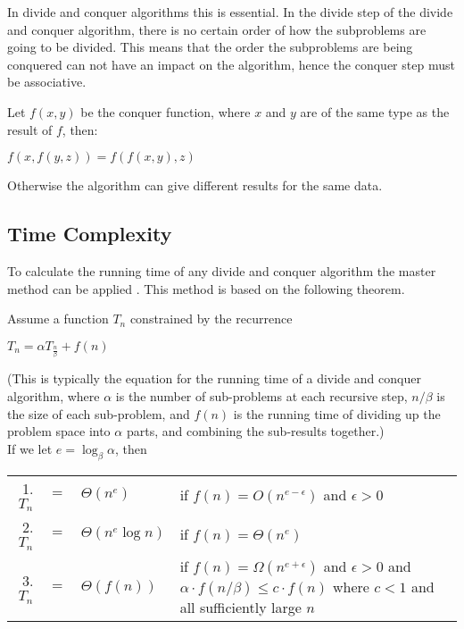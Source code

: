 In divide and conquer algorithms this is essential. In the divide step of the
divide and conquer algorithm, there is no certain order of how the subproblems
are going to be divided. This means that the order the subproblems are being
conquered can not have an impact on the algorithm, hence the conquer step must be
associative.

\begin{example}\label{assprop}
Let $f(x,y)$ be the conquer function, where $x$ and $y$ are of the same type as
the result of $f$, then:
\begin{center}
$f(x,f(y,z)) = f(f(x,y),z)$
\end{center}
Otherwise the algorithm can give different results for the same data.
\end{example}

\subsection{Time Complexity}
To calculate the running time of any divide and conquer algorithm the master
method can be applied \cite{Cormen}. This method is based on the following
theorem.
\begin{theorem} $ $\\
Assume a function $T_n$ constrained by the recurrence
\begin{center}
$T_n = {\alpha}T_{\frac{n}{\beta}}+ f(n)$
\end{center}
(This is typically the equation for the running time of a divide and conquer
algorithm, where $\alpha$ is the number of sub-problems at each recursive step,
$n/\beta$ is the size of each sub-problem, and $f(n)$ is the running time of
dividing up the problem space into $\alpha$ parts, and combining the sub-results
together.)\\
If we let $e = \log_\beta \alpha$, then
\begin{center}
\begin{tabular}{r c l l}
1. $T_n$ & $=$ & $\Theta(n^{e})$ &  if $f(n) = O(n^{e - \epsilon})$ and $\epsilon > 0$\\
2. $T_n$ & $=$ & $\Theta(n^{e} \log n)$ & if $f(n) = \Theta(n^e)$\\
3. $T_n$ & $=$ & $\Theta(f(n))$ & \begin{minipage}[t]{0.6 \columnwidth}
  if $f(n) = \Omega(n^{e+\epsilon})$ and $\epsilon > 0$
  and $\alpha \cdot f(n/\beta) \leq c \cdot f(n)$
  where $c < 1$ and all sufficiently large $n$
  \end{minipage}
\end{tabular}
\end{center}
\qeda
\end{theorem}

